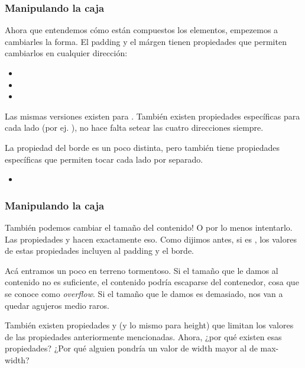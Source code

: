 \begin{frame}
\frametitle{Manipulando la caja}

    Ahora que entendemos cómo están compuestos los elementos, empezemos 
    a cambiarles la forma. El padding y el márgen tienen 
    propiedades que permiten cambiarlos en cualquier dirección:

    \begin{itemize}
        \item {}
        \item {}
        \item {}
    \end{itemize}
    
    Las mismas versiones existen para . También existen propiedades 
    específicas para cada lado (por ej. ), no hace 
    falta setear las cuatro direcciones siempre.

    La propiedad del borde es un poco distinta, pero también tiene propiedades 
    específicas que permiten tocar cada lado por separado.

    \begin{itemize}
        \item {}
    \end{itemize}

\end{frame}

\begin{frame}
\frametitle{Manipulando la caja}

    También podemos cambiar el tamaño del contenido! O por lo menos intentarlo.
    Las propiedades  y  hacen exactamente eso. 
    Como dijimos antes, si  es ,
    los valores de estas propiedades incluyen al padding y el borde.

    Acá entramos un poco en terreno tormentoso. Si el tamaño que le damos 
    al contenido no es suficiente, el contenido podría escaparse del contenedor, 
    cosa que se conoce como \emph{overflow}. Si el tamaño que le damos es demasiado, 
    nos van a quedar agujeros medio raros.

    También existen propiedades  y  
    (y lo mismo para height) que limitan los valores de las propiedades anteriormente 
    mencionadas. Ahora, ¿por qué existen esas propiedades? ¿Por qué alguien pondría 
    un valor de width mayor al de max-width?

\end{frame}

